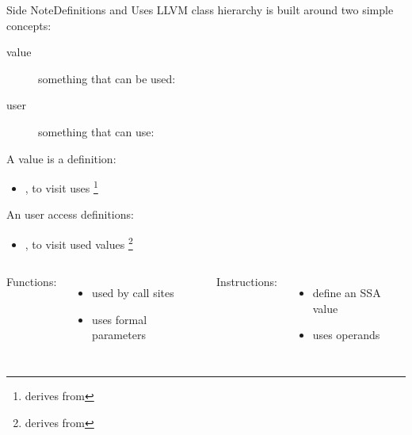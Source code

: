 \begin{frame}{Side Note}{Definitions and Uses}
LLVM class hierarchy is built around two simple concepts:

\begin{description}
\item[value] something that can be used: 
\item[user] something that can use: 
\end{description}

A value is a \alert{definition}:

\begin{itemize}
\item {},
       to visit uses
      \footnote{ derives from }
\end{itemize}

An user access \alert{definitions}:

\begin{itemize}
\item {},
       to visit used values
      \footnote{ derives from }
\end{itemize}

\vfill
\begin{columns}[t]
Functions:

\begin{itemize}
\item used by call sites
\item uses formal parameters
\end{itemize}

Instructions:

\begin{itemize}
\item define an SSA value
\item uses operands
\end{itemize}
\end{columns}
\end{frame}

